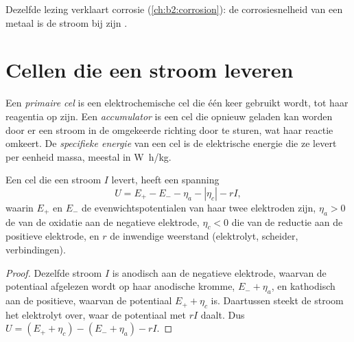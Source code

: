 Dezelfde lezing verklaart corrosie (\cref{ch:b2:corrosion}): de corrosiesnelheid
van een metaal is de stroom bij zijn .

\section{Cellen die een stroom leveren}

\begin{definition}[Batterijen]\label{def:b2:batteries-electrolysis:battery}
Een \emph{primaire cel} is een elektrochemische cel die
één keer gebruikt wordt, tot haar reagentia op zijn. Een \emph{accumulator}
is een cel die opnieuw geladen kan worden door er een stroom in de
omgekeerde richting door te sturen, wat haar reactie omkeert. De \emph{specifieke
energie} van een cel is de elektrische energie die ze levert
per eenheid massa, meestal in \unit{W.h/kg}.
\end{definition}

\begin{proposition}\label{prop:b2:batteries-electrolysis:delivering}
Een cel die een stroom $I$ levert, heeft een spanning
\[
  U = E_+ - E_- - \eta_a - |\eta_c| - rI ,
\]
waarin $E_+$ en $E_-$ de evenwichtspotentialen van haar twee elektroden zijn,
$\eta_a > 0$ de  van de oxidatie aan de negatieve elektrode,
$\eta_c < 0$ die van de reductie aan de positieve elektrode, en $r$ de
inwendige weerstand (elektrolyt, scheider, verbindingen).
\end{proposition}

\begin{proof}
Dezelfde stroom $I$ is anodisch aan de negatieve elektrode, waarvan de potentiaal
afgelezen wordt op haar anodische kromme, $E_- + \eta_a$, en kathodisch aan de positieve,
waarvan de potentiaal $E_+ + \eta_c$ is. Daartussen steekt de stroom het
elektrolyt over, waar de potentiaal met $rI$ daalt. Dus $U = (E_+ + \eta_c) - (E_- +
\eta_a) - rI$.
\end{proof}

